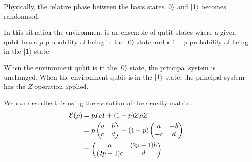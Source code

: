 \documentclass[12pt]{extarticle}
\begin{document}
Physically, the relative phase between the basis states $\ket{0}$ and $\ket{1}$ becomes randomised.


In this situation the environment is an ensemble of qubit states where a given qubit has a $p$ probability of being in the $\ket{0}$ state and a $1-p$ probability of being in the $\ket{1}$ state.

When the environment qubit is in the $\ket{0}$ state, the principal system is unchanged.
When the environment qubit is in the $\ket{1}$ state, the principal system has the $Z$ operation applied.

We can describe this using the evolution of the density matrix:
\begin{align*}
\mathcal{E}(\rho) & = p I \rho I + (1-p) Z \rho Z \\
& = p \begin{pmatrix}a & b \\ c & d\end{pmatrix} + (1-p) \begin{pmatrix}a & -b \\ -c & d\end{pmatrix} \\
& = \begin{pmatrix}a & (2p-1)b \\ (2p-1)c & d\end{pmatrix} \\
\end{align*}
\end{document}
